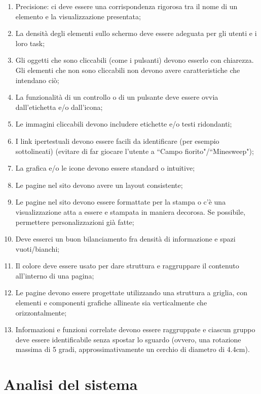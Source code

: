 \begin{enumerate}
    \item Precisione: ci deve essere una corrispondenza rigorosa tra il nome di un elemento e la visualizzazione presentata;\label{lg:30}
    \item La densità degli elementi sullo schermo deve essere adeguata per gli utenti e i loro task;\label{lg:31}
    \item Gli oggetti che sono cliccabili (come i pulsanti) devono esserlo con chiarezza. Gli elementi che non sono cliccabili non devono avere caratteristiche che intendano ciò;\label{lg:32}
    \item La funzionalità di un controllo o di un pulsante deve essere ovvia dall'etichetta e/o dall'icona;\label{lg:33}
    \item Le immagini  cliccabili devono includere etichette e/o testi ridondanti;\label{lg:34}
    \item I link ipertestuali devono essere facili da identificare (per esempio sottolineati) (evitare di far giocare l'utente a ``Campo fiorito"/``Minesweep");\label{lg:35}
    \item La grafica e/o le icone devono essere standard o intuitive;\label{lg:36}
    \item Le pagine nel sito devono avere un layout consistente;\label{lg:37}
    \item Le pagine nel sito devono essere formattate per la stampa o c'è una visualizzazione atta a essere e stampata in maniera decorosa. Se possibile, permettere personalizzazioni già fatte;\label{lg:38}
    \item Deve esserci un buon bilanciamento fra densità di informazione e spazi vuoti/bianchi;\label{lg:39}
    \item Il colore deve essere usato per dare struttura e raggruppare il contenuto all'interno di una pagina;\label{lg:40}
    \item Le pagine devono essere progettate utilizzando una struttura a griglia, con elementi e componenti grafiche allineate sia verticalmente che orizzontalmente;\label{lg:41}
    \item Informazioni e funzioni correlate devono essere raggruppate e ciascun gruppo deve essere identificabile senza spostar lo sguardo (ovvero, una rotazione massima di 5 gradi, approssimativamente un cerchio di diametro di 4.4cm).\label{lg:42}
\end{enumerate}

\section{Analisi del sistema}

